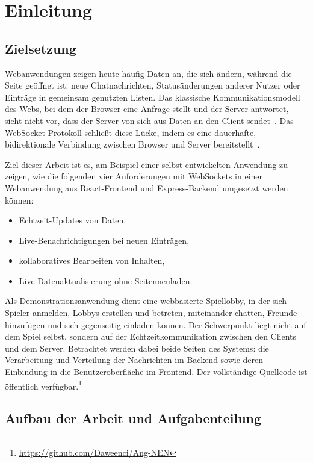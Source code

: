 \chapter{Einleitung}
\label{kap:einleitung}

\section{Zielsetzung}

Webanwendungen zeigen heute häufig Daten an, die sich ändern, während die Seite geöffnet ist: neue Chatnachrichten, Statusänderungen anderer Nutzer oder Einträge in gemeinsam genutzten Listen. Das klassische Kommunikationsmodell des Webs, bei dem der Browser eine Anfrage stellt und der Server antwortet, sieht nicht vor, dass der Server von sich aus Daten an den Client sendet~\cite{RFC9110}. Das WebSocket-Protokoll schließt diese Lücke, indem es eine dauerhafte, bidirektionale Verbindung zwischen Browser und Server bereitstellt~\cite{RFC6455}.

Ziel dieser Arbeit ist es, am Beispiel einer selbst entwickelten Anwendung zu zeigen, wie die folgenden vier Anforderungen mit WebSockets in einer Webanwendung aus React-Frontend und Express-Backend umgesetzt werden können:

\begin{itemize}
  \item Echtzeit-Updates von Daten,
  \item Live-Benachrichtigungen bei neuen Einträgen,
  \item kollaboratives Bearbeiten von Inhalten,
  \item Live-Datenaktualisierung ohne Seitenneuladen.
\end{itemize}

Als Demonstrationsanwendung dient eine webbasierte Spiellobby, in der sich Spieler anmelden, Lobbys erstellen und betreten, miteinander chatten, Freunde hinzufügen und sich gegenseitig einladen können. Der Schwerpunkt liegt nicht auf dem Spiel selbst, sondern auf der Echtzeitkommunikation zwischen den Clients und dem Server. Betrachtet werden dabei beide Seiten des Systems: die Verarbeitung und Verteilung der Nachrichten im Backend sowie deren Einbindung in die Benutzeroberfläche im Frontend. Der vollständige Quellcode ist öffentlich verfügbar.\footnote{\url{https://github.com/Daweenci/Ang-NEN}}

\section{Aufbau der Arbeit und Aufgabenteilung}


